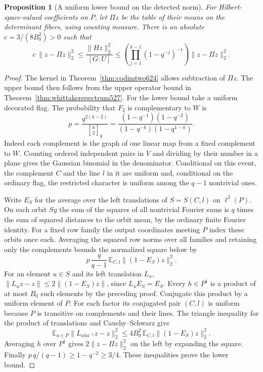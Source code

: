 \documentclass[a4paper,11pt]{article}
\newtheorem{proposition}{Proposition}[section]
\theoremstyle{definition}
\theoremstyle{remark}
\numberwithin{equation}{section}
\begin{document}
\begin{proposition}[A uniform lower bound on the detected norm]
\leavevmode\label{prop:codimnorm624}
For Hilbert-space-valued coefficients on \(P\), let \(\Pi z\)
be the table of their means on the determinant fibers, using
counting measure. There is an absolute \(c=3/(8B_0^2)>0\) such
that
\[
    c\,\|z-\Pi z\|_2^2
       \le \frac{\|Hz\|_2^2}{[G:U]}
       \le \left(\prod_{j=1}^{k-1}(1-q^{-j})^{-1}\right)
                  \|z-\Pi z\|_2^2 .
\]
\end{proposition}
\begin{proof}
The kernel in Theorem~\ref{thm:codimtwo624} allows subtraction
of \(\Pi z\). The upper bound then follows from the upper
operator bound in Theorem~\ref{thm:whittakerspectrum527}.
For the lower bound take a uniform decorated flag. The probability
that \(F_2\) is complementary to \(W\) is
\[
   p=\frac{q^{2(k-2)}}{{k\brack2}_q}
     =\frac{(1-q^{-1})(1-q^{-2})}
                 {(1-q^{-k})(1-q^{1-k})}.
\]
Indeed each complement is the graph of one linear map from a
fixed complement to \(W\). Counting ordered independent pairs
in \(V\) and dividing by their number in a plane gives the
Gaussian binomial in the denominator. Conditional on this
event, the complement \(C\) and the line \(l\) in it are
uniform and, conditional on the ordinary flag, the restricted
character is uniform among the \(q-1\) nontrivial ones.

Write \(E_S\) for the average over the left translations of
\(S=S(C,l)\) on \(\ell^2(P)\). On each orbit \(Sy\) the sum
of the squares of all nontrivial Fourier sums is \(q\) times
the sum of squared distances to the orbit mean, by the ordinary
finite Fourier identity. For a fixed row family the output
coordinates meeting \(P\) index these orbits once each. Averaging
the squared row norms over all families and retaining only the
complements bounds the normalized square below by
\[
              p\,\frac{q}{q-1}\,
                      \mathbb E_{C,l}\|(1-E_S)z\|_2^2.
\]
For an element \(u\in S\) and its left translation \(L_u\),
\(\|L_uz-z\|\le2\|(1-E_S)z\|\), since \(L_uE_S=E_S\).
Every \(h\in P^1\) is a product of at most \(B_0\) such elements
by the preceding proof. Conjugate this product by a uniform
element of \(P\). For each factor its conjugated pair \((C,l)\)
is uniform because \(P\) is transitive on complements and their
lines. The triangle inequality for the product of translations
and Cauchy--Schwarz give
\[
  \mathbb E_{a\in P}\|L_{aha^{-1}}z-z\|_2^2
                 \le 4B_0^2\,\mathbb E_{C,l}\|(1-E_S)z\|_2^2 .
\]
Averaging \(h\) over \(P^1\) gives \(2\|z-\Pi z\|_2^2\) on
the left by expanding the square. Finally \(p\,q/(q-1)\ge
1-q^{-2}\ge3/4\). These inequalities prove the lower bound.
\end{proof}
\end{document}
